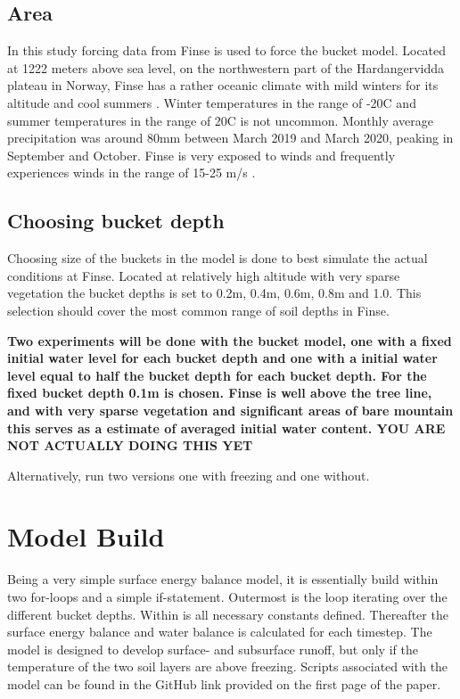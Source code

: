 \documentclass[a4paper,11pt,twocolumn]{article}
\begin{document}
\subsection{Area}
In this study forcing data from Finse is used to force the bucket model. Located at 1222 meters above sea level, on the northwestern part of the Hardangervidda plateau in Norway, Finse has a rather oceanic climate with mild winters for its altitude and cool summers \cite{finse}. Winter temperatures in the range of -20\textdegree C and summer temperatures in the range of 20\textdegree C is not uncommon. Monthly average precipitation was around 80mm between March 2019 and March 2020, peaking in September and October. Finse is very exposed to winds and frequently experiences winds in the range of 15-25 m/s \cite{yr}. 

\subsection{Choosing bucket depth}
Choosing size of the buckets in the model is done to best simulate the actual conditions at Finse. Located at relatively high altitude with very sparse vegetation the bucket depths is set to 0.2m, 0.4m, 0.6m, 0.8m and 1.0. This selection should cover the most common range of soil depths in Finse.

\textbf{Two experiments will be done with the bucket model, one with a fixed initial water level for each bucket depth and one with a initial water level equal to half the bucket depth for each bucket depth. For the fixed bucket depth 0.1m is chosen. Finse is well above the tree line, and with very sparse vegetation and significant areas of bare mountain this serves as a estimate of averaged initial water content. YOU ARE NOT ACTUALLY DOING THIS YET}    

Alternatively, run two versions one with freezing and one without. 


\section{Model Build}

Being a very simple surface energy balance model, it is essentially build within two for-loops and a simple if-statement. Outermost is the loop iterating over the different bucket depths. Within is all necessary constants defined. Thereafter the surface energy balance and water balance is calculated for each timestep. The model is designed to develop surface- and subsurface runoff, but only if the temperature of the two soil layers are above freezing. Scripts associated with the model can be found in the GitHub link provided on the first page of the paper.         
\end{document}
